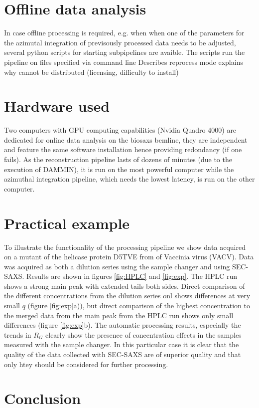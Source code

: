 \documentclass[preprint,pdf]{iucr}              %
\begin{document}
\section{Offline data analysis}
In case offline processing is required, e.g. when when one of the parameters for the azimutal integration of previsously processed data needs to be adjusted, several python scripts for starting subpipelines are avaible. The scripts run the pipeline on files specified via command line   Describes reprocess mode 
explains why cannot be distributed (licensing, difficulty to install)
 
\section{Hardware used}
Two computers with GPU computing capabilities (Nvidia Quadro 4000) are dedicated
for online data analysis on the biosaxs bemline, they are independent and
feature the same software installation hence providing redondancy (if one
fails).
As the  reconstruction pipeline lasts of dozens of minutes
(due to the execution of DAMMIN), it is run on the most powerful computer while 
the azimuthal integration pipeline, which needs the lowest latency, is run on
the other computer.


\section{Practical example}
To illustrate the functionality of the processing pipeline we show data acquired on a mutant of the helicase protein D5TVE from  of Vaccinia virus (VACV). Data was acquired as both a dilution series using the sample changer and using SEC-SAXS. Results are shown in figures \ref{fig:HPLC} and \ref{fig:exp}. The HPLC run shows a strong main peak with extended tails both sides. Direct comparison of the different concentrations from the dilution series onl shows differences at very small $q$ (figure \ref{fig:exp}a)), but direct comparison of the highest concentration to the merged data from the main peak from the HPLC run shows only small differences (figure \ref{fig:exp}b). 
The automatic processing results, especially the trends in $R_{G}$  clearly show the presence of concentration effects in the samples measured with the sample changer. In this particular case it is clear that the quality of the data collected with SEC-SAXS are of superior quality and that only htey should be considered for further processing.

\section{Conclusion}
\end{document}
